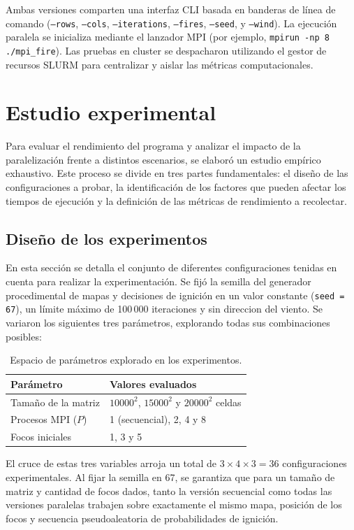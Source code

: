 \documentclass[10pt,a4paper]{article}
\begin{document}
Ambas versiones comparten una interfaz CLI basada en banderas de línea de comando (\texttt{--rows}, \texttt{--cols}, \texttt{--iterations}, \texttt{--fires}, \texttt{--seed}, y \texttt{--wind}). La ejecución paralela se inicializa mediante el lanzador MPI (por ejemplo, \texttt{mpirun -np 8 ./mpi\_fire}). Las pruebas en cluster se despacharon utilizando el gestor de recursos SLURM para centralizar y aislar las métricas computacionales.

\section{Estudio experimental}

Para evaluar el rendimiento del programa y analizar el impacto de la paralelización frente a distintos escenarios, se elaboró un estudio empírico exhaustivo. Este proceso se divide en tres partes fundamentales: el diseño de las configuraciones a probar, la identificación de los factores que pueden afectar los tiempos de ejecución y la definición de las métricas de rendimiento a recolectar.

\subsection{Diseño de los experimentos}

En esta sección se detalla el conjunto de diferentes configuraciones tenidas en cuenta para realizar la experimentación. Se fijó la semilla del generador procedimental de mapas y decisiones de ignición en un valor constante (\texttt{seed = 67}), un límite máximo de 100\,000 iteraciones y sin direccion del viento. Se variaron los siguientes tres parámetros, explorando todas sus combinaciones posibles:

\begin{table}[h]
\centering
\begin{tabular}{|l|l|}
\hline
\textbf{Parámetro} & \textbf{Valores evaluados} \\ \hline
Tamaño de la matriz & $10000^2$, $15000^2$ y $20000^2$ celdas \\ \hline
Procesos MPI ($P$) & 1 (secuencial), 2, 4 y 8 \\ \hline
Focos iniciales & 1, 3 y 5 \\ \hline
\end{tabular}
\caption{Espacio de parámetros explorado en los experimentos.}
\end{table}

El cruce de estas tres variables arroja un total de $3 \times 4 \times 3 = 36$ configuraciones experimentales. Al fijar la semilla en 67, se garantiza que para un tamaño de matriz y cantidad de focos dados, tanto la versión secuencial como todas las versiones paralelas trabajen sobre exactamente el mismo mapa, posición de los focos y secuencia pseudoaleatoria de probabilidades de ignición.
\end{document}
